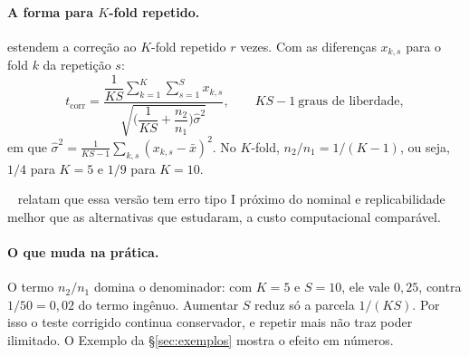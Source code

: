 \documentclass[11pt,a4paper]{article}
\newcommand{\etiqueta}[2]{\tcbox[on line, colback=#1!10, colframe=#1!75!black,
  boxrule=0.4pt, arc=1.2pt, left=1.5pt, right=1.5pt, top=0pt, bottom=0pt,
  fontupper=\sffamily\scriptsize\bfseries]{#2}}
\newcommand{\lit}{\etiqueta{oiBlue}{Literatura}}
\begin{document}
\paragraph{A forma para $K$-fold repetido.} \citet{bouckaert2004} estendem a correção ao $K$-fold repetido $r$ vezes. Com as diferenças $x_{k,s}$ para o fold $k$ da repetição $s$:
\begin{equation}
\boxed{\;t_{\text{corr}}=\frac{\dfrac{1}{KS}\displaystyle\sum_{k=1}^{K}\sum_{s=1}^{S}x_{k,s}}{\sqrt{\Big(\dfrac{1}{KS}+\dfrac{n_2}{n_1}\Big)\hat{\sigma}^2}},\qquad KS-1\ \text{graus de liberdade},\;}
\end{equation}
em que $\hat{\sigma}^2=\frac{1}{KS-1}\sum_{k,s}(x_{k,s}-\bar{x})^2$. No $K$-fold, $n_2/n_1=1/(K-1)$, ou seja, $1/4$ para $K=5$ e $1/9$ para $K=10$.

\lit\ \citet{bouckaert2004} relatam que essa versão tem erro tipo I próximo do nominal e replicabilidade melhor que as alternativas que estudaram, a custo computacional comparável.

\paragraph{O que muda na prática.} O termo $n_2/n_1$ domina o denominador: com $K=5$ e $S=10$, ele vale $0{,}25$, contra $1/50=0{,}02$ do termo ingênuo. Aumentar $S$ reduz só a parcela $1/(KS)$. Por isso o teste corrigido continua conservador, e repetir mais não traz poder ilimitado. O Exemplo da \S\ref{sec:exemplos} mostra o efeito em números.
\end{document}
